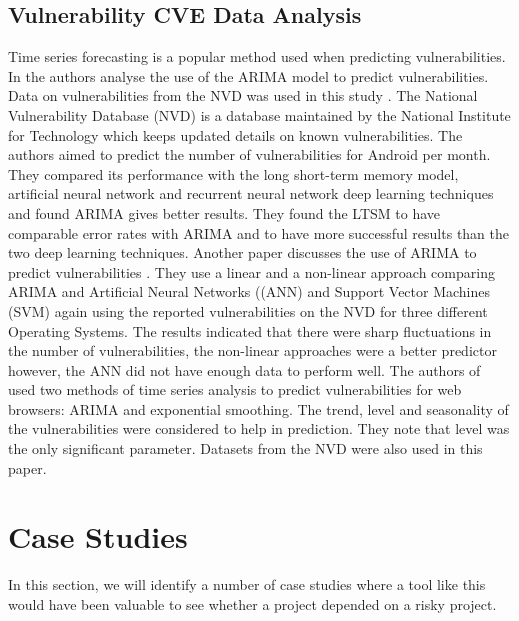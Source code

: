 \documentclass[10pt, compsoc, conference]{IEEEtran}
\begin{document}
\subsection{Vulnerability CVE Data Analysis}
Time series forecasting is a popular method used when predicting vulnerabilities. In \cite{gencer_time_2021} the authors analyse the use of the ARIMA model to predict vulnerabilities. Data on vulnerabilities from the NVD was used in this study \cite{noauthor_vulnerability_nodate}. The National Vulnerability Database (NVD) is a database maintained by the National Institute for Technology which keeps updated details on known vulnerabilities. The authors aimed to predict the number of vulnerabilities for Android per month. They compared its performance with the long short-term memory model, artificial neural network and recurrent neural network deep learning techniques and found ARIMA gives better results. They found the LTSM to have comparable error rates with ARIMA and to have more successful results than the two deep learning techniques. Another paper discusses the use of ARIMA to predict vulnerabilities \cite{pokhrel_cybersecurity_2017}. They use a linear and a non-linear approach comparing ARIMA and Artificial Neural Networks ((ANN) and Support Vector Machines (SVM) again using the reported vulnerabilities on the NVD for three different Operating Systems. The results indicated that there were sharp fluctuations in the number of vulnerabilities, the non-linear approaches were a better predictor however, the ANN did not have enough data to perform well. The authors of \cite{roumani_time_2015} used two methods of time series analysis to predict vulnerabilities for web browsers: ARIMA and exponential smoothing. The trend, level and seasonality of the vulnerabilities were considered to help in prediction. They note that level was the only significant parameter. Datasets from the NVD were also used in this paper.

\section{Case Studies}
In this section, we will identify a number of case studies where a tool like this would have been valuable to see whether a project depended on a risky project. 
\end{document}

